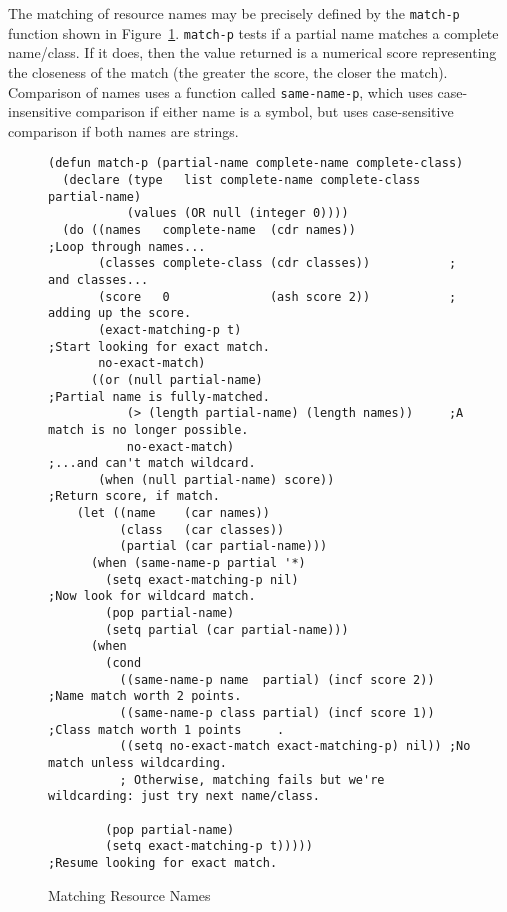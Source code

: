 The matching of resource names may be precisely defined by the {\tt match-p}
function shown in Figure~\ref{fig:match-p}. {\tt match-p} tests if a partial
name matches a complete
name/class.  If it does, then the value returned is a numerical score
representing the closeness of the match (the greater the score, the closer the
match). Comparison of names uses a function called {\tt same-name-p}, which uses
case-insensitive comparison if either name is a symbol, but  uses
case-sensitive comparison if both names are strings.

\begin{figure}[hb]
\caption{Matching Resource Names}
\label{fig:match-p}
\begin{verbatim}
(defun match-p (partial-name complete-name complete-class) 
  (declare (type   list complete-name complete-class partial-name)
           (values (OR null (integer 0))))  
  (do ((names   complete-name  (cdr names))             ;Loop through names...
       (classes complete-class (cdr classes))           ;  and classes...
       (score   0              (ash score 2))           ;  adding up the score.
       (exact-matching-p t)                             ;Start looking for exact match.
       no-exact-match)
      ((or (null partial-name)                          ;Partial name is fully-matched.
           (> (length partial-name) (length names))     ;A match is no longer possible.
           no-exact-match)                              ;...and can't match wildcard.
       (when (null partial-name) score))                ;Return score, if match.      
    (let ((name    (car names))
          (class   (car classes))
          (partial (car partial-name)))
      (when (same-name-p partial '*)
        (setq exact-matching-p nil)                     ;Now look for wildcard match.
        (pop partial-name)
        (setq partial (car partial-name)))
      (when
        (cond
          ((same-name-p name  partial) (incf score 2))  ;Name match worth 2 points. 
          ((same-name-p class partial) (incf score 1))  ;Class match worth 1 points     .        
          ((setq no-exact-match exact-matching-p) nil)) ;No match unless wildcarding.
          ; Otherwise, matching fails but we're wildcarding: just try next name/class.
                       
        (pop partial-name)
        (setq exact-matching-p t)))))                   ;Resume looking for exact match.
\end{verbatim}
\end{figure}

